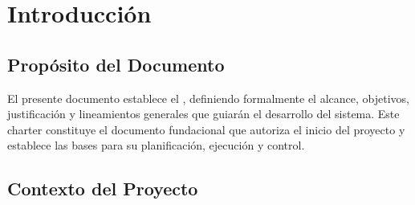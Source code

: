 
\def\docTitle{Charter del Proyecto BookMate}
\def\docSubtitle{Sistema de Recomendación de Libros con Inteligencia Artificial}
\def\docWeek{7}
\def\docVersion{1.0}





\makeUNIcover

\versionTable

\tableofcontents
\newpage

\section{Introducción}

\subsection{Propósito del Documento}

El presente documento establece el , definiendo formalmente el alcance, objetivos, justificación y lineamientos generales que guiarán el desarrollo del sistema. Este charter constituye el documento fundacional que autoriza el inicio del proyecto y establece las bases para su planificación, ejecución y control.

\subsection{Contexto del Proyecto}


